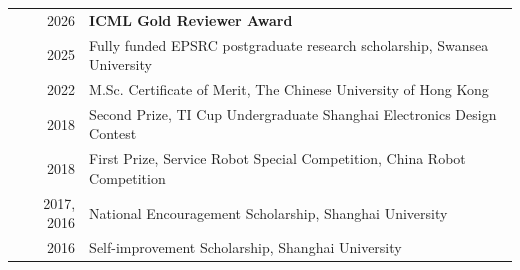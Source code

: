 \begingroup
\small
\renewcommand{\arraystretch}{0.96}
\begin{tabularx}{\linewidth}{@{}>{\color{darkGrey}}r >{\raggedright\arraybackslash}X@{}}
  2026 & \textbf{ICML Gold Reviewer Award} \\
  2025 & Fully funded EPSRC postgraduate research scholarship, Swansea University \\
  2022 & M.Sc. Certificate of Merit, The Chinese University of Hong Kong \\
  2018 & Second Prize, TI Cup Undergraduate Shanghai Electronics Design Contest \\
  2018 & First Prize, Service Robot Special Competition, China Robot Competition \\
  2017, 2016 & National Encouragement Scholarship, Shanghai University \\
  2016 & Self-improvement Scholarship, Shanghai University
\end{tabularx}\par
\endgroup
